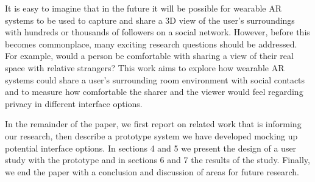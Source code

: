 It is easy to imagine that in the future it will be possible for wearable AR systems to be used to capture and share a 3D view of the user's surroundings with hundreds or thousands of followers on a social network. However, before this becomes commonplace, many exciting research questions should be addressed. For example, would a person be comfortable with sharing a view of their real space with relative strangers? This work aims to explore how wearable AR systems could share a user’s surrounding room environment with social contacts and to measure how comfortable the sharer and the viewer would feel regarding privacy in different interface options. 

In the remainder of the paper, we first report on related work that is informing our research, then describe a prototype system we have developed mocking up potential interface options. In sections 4 and 5 we present the design of a user study with the prototype and in sections 6 and 7 the results of the study. Finally, we end the paper with a conclusion and discussion of areas for future research.






